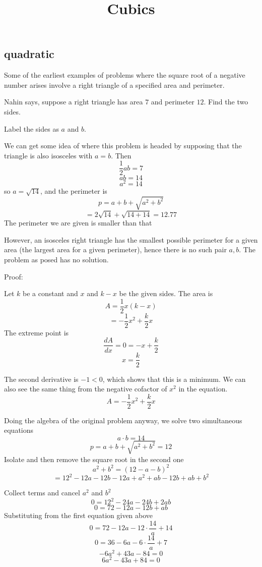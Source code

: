 \documentclass[11pt, oneside]{article}
\title{Cubics}
\date{}
\begin{document}
\maketitle
\Large

\subsection*{quadratic}

Some of the earliest examples of problems where the square root of a negative number arises involve a right triangle of a specified area and perimeter.  

Nahin says, suppose a right triangle has area $7$ and perimeter $12$.  Find the two sides.  

Label the sides as $a$ and $b$.

We can get some idea of where this problem is headed by supposing that the triangle is also isosceles with $a = b$.  Then 
\[ \frac{1}{2} ab = 7 \]
\[ ab = 14 \]
\[ a^2 = 14 \] 
so $a = \sqrt{14}$, and the perimeter is
\[ p = a + b + \sqrt{a^2 + b^2} \]
\[ = 2 \sqrt{14} + \sqrt{14 + 14} = 12.77 \]
The perimeter we are given is smaller than that

However, an isosceles right triangle has the smallest possible perimeter for a given area (the largest area for a given perimeter), hence there is no such pair $a,b$.
The problem as posed has no solution.

Proof:

Let $k$ be a constant and $x$ and $k - x$ be the given sides.  The area is
\[ A = \frac{1}{2} x (k - x) \]
\[ = -\frac{1}{2} x^2 + \frac{k}{2} x \]
The extreme point is
\[ \frac{dA}{dx} = 0 = - x + \frac{k}{2} \]
\[ x = \frac{k}{2} \]

The second derivative is $-1 < 0$, which shows that this is a minimum.  We can also see the same thing from the negative cofactor of $x^2$ in the equation.
\[ A = -\frac{1}{2} x^2 + \frac{k}{2} x \]

Doing the algebra of the original problem anyway, we solve two simultaneous equations
\[ a \cdot b = 14 \]
\[ p = a + b + \sqrt{a^2 + b^2} = 12 \]
Isolate and then remove the square root in the second one
\[ a^2 + b^2 = (12 - a - b)^2 \]
\[ = 12^2 - 12a - 12b - 12a + a^2 + ab - 12b + ab + b^2 \]

Collect terms and cancel $a^2$ and $b^2$
\[ 0 = 12^2 - 24a - 24b + 2ab \]
\[ 0 = 72 - 12a - 12b + ab \]
Substituting from the first equation given above
\[ 0 = 72 - 12a - 12 \cdot \frac{14}{a} + 14 \]
\[ 0 = 36 - 6a - 6 \cdot \frac{14}{a} + 7 \]
\[ -6 a^2 + 43a - 84 = 0 \]
\[ 6 a^2 - 43a + 84 = 0 \]
\end{document}
